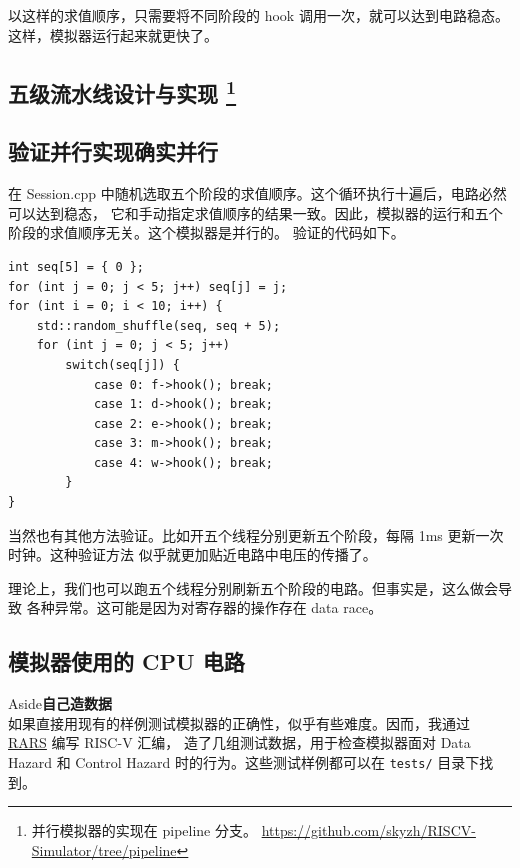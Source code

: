 \documentclass[12pt]{article}
\newenvironment{aside}[1]
    { \begin{tcolorbox}[enlarge top by=0.5cm, enlarge bottom by=0.5cm] Aside\space\space\space\space \textbf{#1} \\
        } { \end{tcolorbox} }
\begin{document}
    以这样的求值顺序，只需要将不同阶段的 hook 调用一次，就可以达到电路稳态。这样，模拟器运行起来就更快了。

    \subsection{五级流水线设计与实现\protect
        \footnote{并行模拟器的实现在 pipeline 分支。
        \url{https://github.com/skyzh/RISCV-Simulator/tree/pipeline}}}

    \subsection{验证并行实现确实并行}

    在 Session.cpp 中随机选取五个阶段的求值顺序。这个循环执行十遍后，电路必然可以达到稳态，
    它和手动指定求值顺序的结果一致。因此，模拟器的运行和五个阶段的求值顺序无关。这个模拟器是并行的。
    验证的代码如下。

    \begin{verbatim}
int seq[5] = { 0 };
for (int j = 0; j < 5; j++) seq[j] = j;
for (int i = 0; i < 10; i++) {
    std::random_shuffle(seq, seq + 5);
    for (int j = 0; j < 5; j++)
        switch(seq[j]) {
            case 0: f->hook(); break;
            case 1: d->hook(); break;
            case 2: e->hook(); break;
            case 3: m->hook(); break;
            case 4: w->hook(); break;
        }
}
    \end{verbatim}

    当然也有其他方法验证。比如开五个线程分别更新五个阶段，每隔 1ms 更新一次时钟。这种验证方法
    似乎就更加贴近电路中电压的传播了。

    \begin{tcolorbox}
        理论上，我们也可以跑五个线程分别刷新五个阶段的电路。但事实是，这么做会导致
        各种异常。这可能是因为对寄存器的操作存在 data race。
    \end{tcolorbox}

    \subsection{模拟器使用的 CPU 电路}

    \begin{aside}{自己造数据}
        如果直接用现有的样例测试模拟器的正确性，似乎有些难度。因而，我通过 
        \href{https://github.com/TheThirdOne/rars}{RARS} 编写 RISC-V 汇编，
        造了几组测试数据，用于检查模拟器面对 Data Hazard 和
        Control Hazard 时的行为。这些测试样例都可以在 \texttt{tests/} 目录下找到。
    \end{aside}
\end{document}

